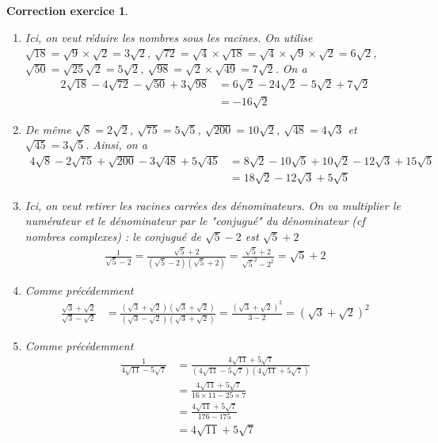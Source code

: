 \documentclass[12pt]{article}
\newtheorem{correction}{\bf Correction exercice}
\newenvironment{cor}{
\begin{correction}\smallskip\normalfont}{\end{correction}
}
\newif\ifcorrige\corrigetrue
\begin{document}
\ifcorrige
\color{magenta}
\begin{cor}
  $\qquad$
\begin{enumerate}
\item Ici, on veut r\'eduire les nombres sous les racines.
  On utilise $\sqrt{18} = \sqrt{9} \times \sqrt{2} = 3\sqrt{2}$,
  $\sqrt{72} = \sqrt{4} \times \sqrt{18} = \sqrt{4} \times \sqrt{9} \times \sqrt{2} = 6\sqrt{2}$,
  $\sqrt{50} = \sqrt{25} \sqrt{2} = 5 \sqrt{2}$,
  $\sqrt{98} = \sqrt{2} \times \sqrt{49} = 7 \sqrt{2}$.
  On a
  \begin{align*}
    2 \sqrt{18} - 4 \sqrt{72} - \sqrt{50} + 3\sqrt{98}
    &= 6 \sqrt{2} - 24 \sqrt{2} - 5 \sqrt{2} + 7 \sqrt{2}
    \\
    &= -16 \sqrt{2}
  \end{align*}
\item De m\^eme
  $\sqrt{8} = 2 \sqrt{2}$, $\sqrt{75} = 5 \sqrt{5}$, $\sqrt{200} = 10 \sqrt{2}$,
  $\sqrt{48} = 4 \sqrt{3}$ et $\sqrt{45} = 3 \sqrt{5}$.
  Ainsi, on a
  \begin{align*}
    4\sqrt{8} -2\sqrt{75} + \sqrt{200}-3\sqrt{48}+5\sqrt{45}
    &= 8 \sqrt{2} - 10 \sqrt{5} + 10 \sqrt{2} - 12 \sqrt{3} +15 \sqrt{5}
    \\
    &= 18 \sqrt{2} - 12 \sqrt{3} + 5 \sqrt{5}
  \end{align*}
\item Ici, on veut retirer les racines carr\'ees des d\'enominateurs.
  On va multiplier le num\'erateur et le d\'enominateur par le "conjugu\'e" du d\'enominateur
  (cf nombres complexes) : le conjugu\'e de $\sqrt{5}-2$ est $\sqrt{5}+2$
  \begin{align*}
    \frac1{\sqrt{5}-2}
    = \frac{\sqrt{5}+2}{(\sqrt{5}-2)(\sqrt{5}+2)}= \frac{\sqrt{5}+2}{\sqrt{5}^2-2^2}
    = \sqrt{5}+2
  \end{align*}
\item Comme pr\'ec\'edemment
  \begin{align*}
    \frac{\sqrt{3}+\sqrt{2}}{\sqrt{3}-\sqrt{2}}
    &= \frac{(\sqrt{3}+\sqrt{2})(\sqrt{3}+\sqrt{2})}{(\sqrt{3}-\sqrt{2})(\sqrt{3}+\sqrt{2})}
      = \frac{(\sqrt{3}+\sqrt{2})^2}{3-2}
      = (\sqrt{3}+\sqrt{2})^2
  \end{align*}

\item
  Comme pr\'ec\'edemment
  \begin{align*}
    \frac1{4\sqrt{11} -5\sqrt{7}}
    &= \frac{4\sqrt{11}+5\sqrt{7}}{(4\sqrt{11} -5\sqrt{7})(4\sqrt{11} +5\sqrt{7})}
    \\
    &= \frac{4\sqrt{11}+5\sqrt{7}}{16 \times 11 - 25 \times 7}
    \\
    &= \frac{4\sqrt{11}+5\sqrt{7}}{176 - 175}
    \\
    &= 4\sqrt{11}+5\sqrt{7}
  \end{align*}


\end{enumerate}
\end{cor}
\end{document}
